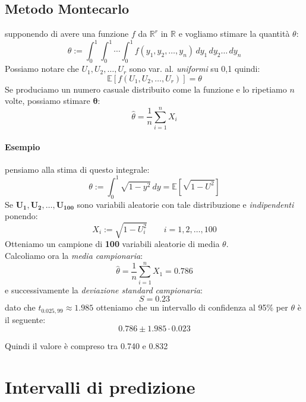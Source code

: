 \documentclass[]{article}
\newcommand{\ev}{\mathbb{E}[X]}
\renewcommand{\ev}[1]{\mathbb{E}\left[#1\right]}
\begin{document}
    \subsection{Metodo Montecarlo}
    supponendo di avere una funzione $f$ da $\mathbb{R}^r$ in $\mathbb{R}$ e vogliamo stimare la quantità $\theta$:
    \[ \theta := \int_{0}^{1} \int_{0}^{1} \cdots \int_{0}^{1} f(y_1, y_2, \ldots, y_n) \, dy_1 \, dy_2 \ldots \, dy_n \]
    Possiamo notare che $U_1, U_2, \ldots, U_r$ sono var. al. \textit{uniformi} su 0,1 quindi:
    \[ \ev{f(U_1, U_2, \ldots, U_r)} = \theta \]
    Se produciamo un numero casuale distribuito come la funzione e lo ripetiamo $n$ volte, possiamo stimare $\boldsymbol{\theta}$:
    \[ \hat{\theta} = \frac{1}{n} \sum_{i = 1}^{n} X_i \]
    \paragraph{Esempio} pensiamo alla stima di questo integrale:
    \[ \theta := \int_{0}^{1} \sqrt{1 - y^2} \, dy = \ev{\sqrt{1-U^2}} \]
    Se $\boldsymbol{U_1, U_2, \ldots, U_{100}}$ sono variabili aleatorie con tale distribuzione e \textit{indipendenti} ponendo:
    \[ X_i := \sqrt{1-U^2_i} \qquad i = 1,2, \ldots, 100 \]
    Otteniamo un campione di \textbf{100} variabili aleatorie di media $\theta$. \\ 
    Calcoliamo ora la \textit{media campionaria}:
    \[ \hat{\theta} = \frac{1}{n} \sum_{i=1}^{n} X_1 = 0.786 \]
    e successivamente la \textit{deviazione standard campionaria}:
    \[ S = 0.23 \]
    dato che $t_{0.025, 99} \approx 1.985$ otteniamo che un intervallo di confidenza al 95\% per $\theta$ è il seguente:
    \[ 0.786 \pm 1.985 \cdot 0.023 \]
    \centerline{Quindi il valore è compreso tra 0.740 e 0.832}
    \newpage
    \section{Intervalli di predizione}
\end{document}
